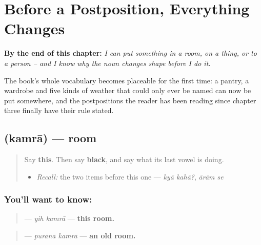 
\chapter{Before a Postposition, Everything Changes}
\label{ch:ur-before-a-postposition}

\begin{chapteropening}
\textbf{By the end of this chapter:} \emph{I can put something in a room, on a thing, or to a person -- and I know why the noun changes shape before I do it.}

The book's whole vocabulary becomes placeable for the first time: a pantry, a wardrobe and five kinds of weather that could only ever be named can now be put somewhere, and the postpositions the reader has been reading since chapter three finally have their rule stated.
\end{chapteropening}

\section[\texorpdfstring{\ur{کمرہ} (kamrā)}{کمرہ (kamrā)}]{ (kamrā) — room}

\label{lesson:UR-C23-kamra}



\begin{quote}
Say \textbf{this}. Then say \textbf{black}, and say what its last vowel is doing.

\begin{itemize}
\raggedright
  \item \emph{Recall:} the two items before this one — \emph{kyā kahā?}, \emph{ārām se}
\end{itemize}
\end{quote}

\subsection*{You'll want to know: }
\begin{quote}
\textbf{ } — \emph{yih kamrā} — \textbf{this room.}
\end{quote}

\begin{quote}
\textbf{ } — \emph{purānā kamrā} — \textbf{an old room.}
\end{quote}


